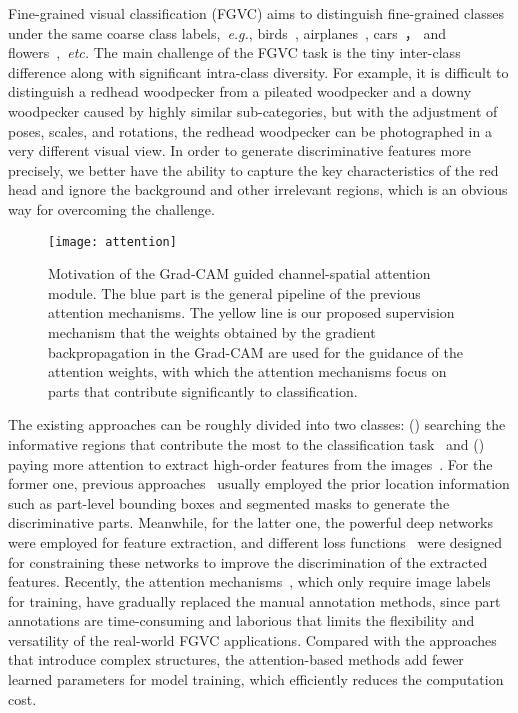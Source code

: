 \documentclass{article}
\begin{document}
Fine-grained visual classification (FGVC) aims to distinguish fine-grained classes under the same coarse class labels,~\emph{e.g.}, birds~\cite{birds}, airplanes~\cite{air}, cars~\cite{cars}， and flowers~\cite{flowers},~\emph{etc.} The main challenge of the FGVC task is the tiny inter-class difference along with significant intra-class diversity. For example, it is difficult to distinguish a redhead woodpecker from a pileated woodpecker and a downy woodpecker caused by highly similar sub-categories, but with the adjustment of poses, scales, and rotations, the redhead woodpecker can be photographed in a very different visual view. In order to generate discriminative features more precisely, we better have the ability to capture the key characteristics of the red head and ignore the background and other irrelevant regions, which is an obvious way for overcoming the challenge. 

\begin{figure}
	\centering 
	\texttt{[image: attention]}  
	\vspace{-6mm}
	\caption{Motivation of the Grad-CAM guided channel-spatial attention module. The blue part is the general pipeline of the previous attention mechanisms. The yellow line is our proposed supervision mechanism that the weights obtained by the gradient backpropagation in the Grad-CAM are used for the guidance of the attention weights, with which the attention mechanisms focus on parts that contribute significantly to classification.}\label{fig:attention}
	
\end{figure}


    The existing approaches can be roughly divided into two classes: () searching the informative regions that contribute the most to the classification task~\cite{anno,TASN,NTS} and () paying more attention to extract high-order features from the images~\cite{BP,BT,mamcloss,mc}. For the former one, previous approaches~\cite{anno} usually employed the prior location information such as part-level bounding boxes and segmented masks to generate the discriminative parts. Meanwhile, for the latter one, the powerful deep networks~\cite{BP,BT} were employed for feature extraction, and different loss functions~\cite{mamcloss,mc} were designed for constraining these networks to improve the discrimination of the extracted features. Recently, the attention mechanisms~\cite{SENet,MA-CNN,RA-CNN}, which only require image labels for training, have gradually replaced the   manual annotation methods, since part annotations are time-consuming and laborious that limits the flexibility and versatility of the real-world FGVC applications. Compared with the approaches that introduce complex structures, the attention-based methods add fewer learned parameters for model training, which efficiently reduces the computation cost.
\end{document}
